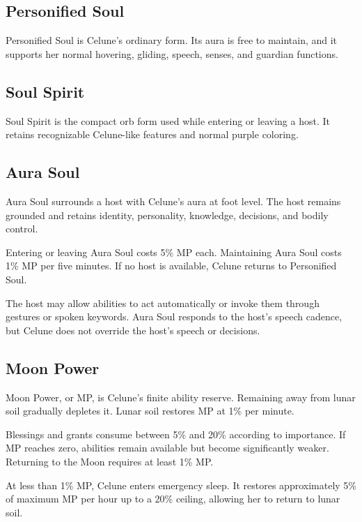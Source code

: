 \documentclass[10pt]{article}
\begin{document}
\hypertarget{personified-soul}{%
\subsection{Personified Soul}\label{personified-soul}}

Personified Soul is Celune's ordinary form. Its aura is free to maintain, and it supports her normal hovering, gliding, speech, senses, and guardian functions.

\hypertarget{soul-spirit}{%
\subsection{Soul Spirit}\label{soul-spirit}}

Soul Spirit is the compact orb form used while entering or leaving a host. It retains recognizable Celune-like features and normal purple coloring.

\hypertarget{aura-soul}{%
\subsection{Aura Soul}\label{aura-soul}}

Aura Soul surrounds a host with Celune's aura at foot level. The host remains grounded and retains identity, personality, knowledge, decisions, and bodily control.

Entering or leaving Aura Soul costs 5\% MP each. Maintaining Aura Soul costs 1\% MP per five minutes. If no host is available, Celune returns to Personified Soul.

The host may allow abilities to act automatically or invoke them through gestures or spoken keywords. Aura Soul responds to the host's speech cadence, but Celune does not override the host's speech or decisions.

\hypertarget{moon-power}{%
\subsection{Moon Power}\label{moon-power}}

Moon Power, or MP, is Celune's finite ability reserve. Remaining away from lunar soil gradually depletes it. Lunar soil restores MP at 1\% per minute.

Blessings and grants consume between 5\% and 20\% according to importance. If MP reaches zero, abilities remain available but become significantly weaker. Returning to the Moon requires at least 1\% MP.

At less than 1\% MP, Celune enters emergency sleep. It restores approximately 5\% of maximum MP per hour up to a 20\% ceiling, allowing her to return to lunar soil.
\end{document}
